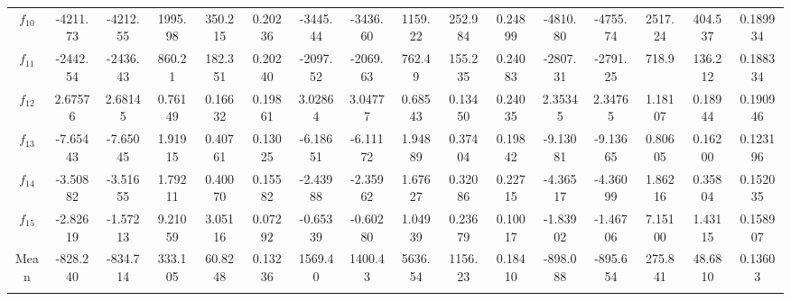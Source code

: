 \documentclass[paper=a4, fontsize=11pt]{scrartcl} %
\numberwithin{equation}{section} %
\numberwithin{figure}{section} %
\numberwithin{table}{section} %
\begin{document}
\begin{landscape}
\begin{table}
\begin{tabular}{c|ccccc|ccccc|ccccc}
			$f_{10}$ & -4211.73 & -4212.55 & 1995.98 & 350.215 & 0.20236 & -3445.44 & -3436.60 & 1159.22 & 252.984 & 0.24899 & -4810.80 & -4755.74 & 2517.24 & 404.537 & 0.189934\\
			$f_{11}$ & -2442.54 & -2436.43 & 860.21  & 182.351 & 0.20240 & -2097.52 & -2069.63 & 762.49  & 155.235 & 0.24083 & -2807.31 & -2791.25 & 718.9   & 136.212 & 0.188334\\
			$f_{12}$ &  2.67576 &  2.68145 & 0.76149 & 0.16632 & 0.19861 &  3.02864 &  3.04777 & 0.68543 & 0.13450 & 0.24035 &  2.35345 &  2.34765 & 1.18107 & 0.18944 & 0.190946\\
			$f_{13}$ & -7.65443 & -7.65045 & 1.91915 & 0.40761 & 0.13025 & -6.18651 & -6.11172 & 1.94889 & 0.37404 & 0.19842 & -9.13081 & -9.13665 & 0.80605 & 0.16200 & 0.123196\\
			$f_{14}$ & -3.50882 & -3.51655 & 1.79211 & 0.40070 & 0.15582 & -2.43988 & -2.35962 & 1.67627 & 0.32086 & 0.22715 & -4.36517 & -4.36099 & 1.86216 & 0.35804 & 0.152035\\
			$f_{15}$ & -2.82619 & -1.57213 & 9.21059 & 3.05116 & 0.07292 & -0.65339 & -0.60280 & 1.04939 & 0.23679 & 0.10017 & -1.83902 & -1.46706 & 7.15100 & 1.43115 & 0.158907\\
			
			\noalign{\smallskip}\hline\noalign{\smallskip}
			Mean & -828.240 & -834.714 & 333.105 & 60.8248 & 0.13236 & 1569.40 & 1400.43 & 5636.54 & 1156.23 & 0.18410 & -898.088 & -895.654 & 275.841 & 48.6810 & 0.13603 \\
			\noalign{\smallskip}\hline\noalign{\smallskip}
			\multicolumn{16}{l}{\tiny $^1$ 3.2GHz AMD Ryzen 7 1700X, 16 GB RAM}
		\end{tabular}\label{DE_10}
	\end{table}


\end{landscape}
\end{document}
